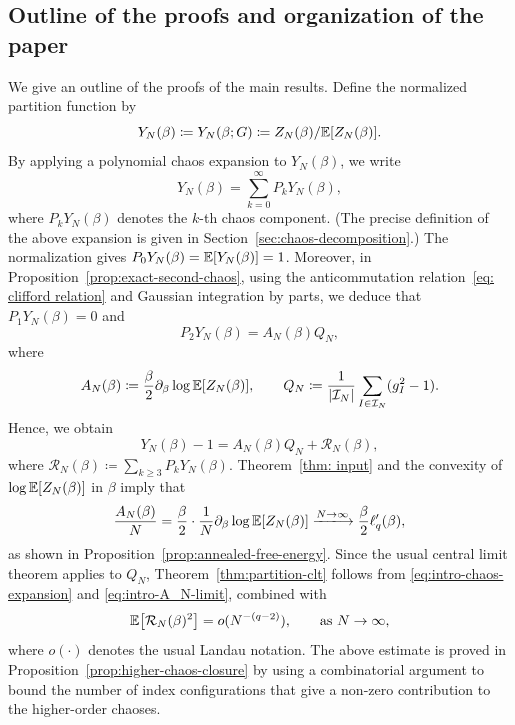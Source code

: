 \documentclass[../CLT_SYK.tex]{subfiles}
\begin{document}
\subsection{Outline of the proofs and organization of the paper}

We give an outline of the proofs of the main results.
Define the normalized partition function by
\begin{equation} \label{eq:Y_N}
  Y_N(\beta) \coloneqq Y_N(\beta; G) \coloneqq {Z_N(\beta)}/{\mathbb E[Z_N(\beta)]}.
\end{equation}
By applying a polynomial chaos expansion to $Y_N(\beta)$, we write 
\[
  Y_N(\beta) = \sum_{k = 0}^\infty P_kY_N(\beta),
\]
where $P_k Y_N(\beta)$ denotes the $k$-th chaos component.
(The precise definition of the above expansion is given in Section~\ref{sec:chaos-decomposition}.) The normalization gives $P_0 Y_N(\beta) = \mathbb E [Y_N(\beta)] = 1$. Moreover, in {Proposition~\ref{prop:exact-second-chaos}}, using the anticommutation relation~\eqref{eq: clifford relation} and Gaussian integration by parts, we deduce that $P_1 Y_N(\beta) = 0$ and
\[ 
  P_2Y_N(\beta) = A_N(\beta) Q_N,
\]
where
\begin{equation}\label{eq:finite-N-FTW-coefficient}
      A_N(\beta) \coloneqq \frac{\beta}{2}\partial_\beta\log \mathbb E[Z_N(\beta)],
  \qquad
    Q_N \coloneqq \frac1{|\mathcal I_N|}\sum_{I\in\mathcal I_N}(g_I^2-1).
\end{equation}
Hence, we obtain
\begin{equation}\label{eq:intro-chaos-expansion}
  Y_N(\beta)-1=
  A_N(\beta)Q_N+\mathcal R_N(\beta),
\end{equation}
where $\mathcal R_N(\beta) \coloneqq \sum_{k \geq 3} P_k Y_N(\beta)$.
Theorem~\ref{thm: input} and the convexity of $\log \mathbb E[Z_N(\beta)]$ in $\beta$ imply that
\begin{equation}\label{eq:intro-A_N-limit}
  \frac{A_N(\beta)}N
  = 
  \frac{\beta}{2}\cdot \frac{1}{N}\partial_\beta\log \E[Z_N(\beta)]
  \xlongrightarrow{N \to \infty} \frac{\beta}{2}\ell_q'(\beta),
\end{equation}
as shown in Proposition~\ref{prop:annealed-free-energy}.
Since the usual central limit theorem applies to $Q_N$, Theorem~\ref{thm:partition-clt} follows from \eqref{eq:intro-chaos-expansion} and \eqref{eq:intro-A_N-limit}, combined with  
\begin{equation}\label{eq:intro-higher-chaoses}
  \mathbb E \bigl[ \mathcal R_N(\beta)^2 \bigr]= o(N^{-(q-2)}),\qquad \text{as } N \to \infty,
\end{equation}
where $o(\cdot)$ denotes the usual Landau notation.
The above estimate is proved in Proposition~\ref{prop:higher-chaos-closure} 
 {by using a combinatorial argument to bound the number of index configurations that give a non-zero contribution to the higher-order chaoses.}
\end{document}

